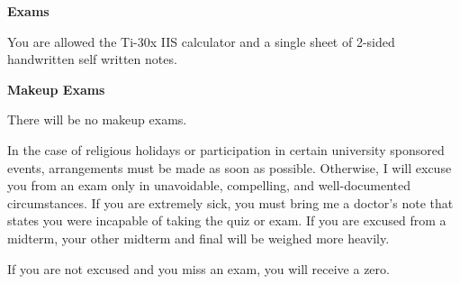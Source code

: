 \documentclass{article}
\begin{document}
\textbf{Exams}

You are allowed the Ti-30x IIS calculator and a single sheet of 2-sided
handwritten self written notes.

\textbf{Makeup Exams}

There will be no makeup exams.

In the case of religious holidays or participation in certain university
sponsored events, arrangements must be made as soon as possible. Otherwise, I
will excuse you from an exam only in unavoidable, compelling, and
well-documented circumstances. If you are extremely sick, you must bring me a
doctor's note that states you were incapable of taking the quiz or exam. If you
are excused from a midterm, your other midterm and final will be weighed more
heavily.

If you are not excused and you miss an exam, you will receive a zero.
\end{document}
